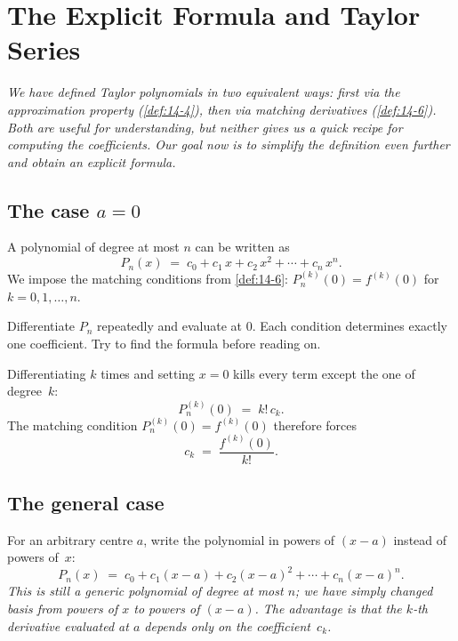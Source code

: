 \section{The Explicit Formula and Taylor Series}
\label{sec:14.5}

\textit{We have defined Taylor polynomials in two equivalent ways: first via the approximation property (\cref{def:14-4}), then via matching derivatives (\cref{def:14-6}).  Both are useful for understanding, but neither gives us a quick recipe for computing the coefficients.  Our goal now is to simplify the definition even further and obtain an explicit formula.}

\subsection*{The case $a=0$}

A polynomial of degree at most $n$ can be written as
\[
  P_{n}(x) \;=\; c_{0}+c_{1}\,x+c_{2}\,x^{2}+\cdots+c_{n}\,x^{n}.
\]
We impose the matching conditions from \cref{def:14-6}: $P_{n}^{(k)}(0)=f^{(k)}(0)$ for $k=0,1,\ldots,n$.

\begin{remark}
Differentiate $P_{n}$ repeatedly and evaluate at $0$.  Each condition determines exactly one coefficient.  Try to find the formula before reading on.
\end{remark}

Differentiating $k$ times and setting $x=0$ kills every term except the one of degree~$k$:
\[
  P_{n}^{(k)}(0) \;=\; k!\,c_{k}.
\]
The matching condition $P_{n}^{(k)}(0)=f^{(k)}(0)$ therefore forces
\[
  c_{k} \;=\; \frac{f^{(k)}(0)}{k!}.
\]

\subsection*{The general case}

For an arbitrary centre $a$, write the polynomial in powers of $(x-a)$ instead of powers of~$x$:
\[
  P_{n}(x) \;=\; c_{0}+c_{1}(x-a)+c_{2}(x-a)^{2}+\cdots+c_{n}(x-a)^{n}.
\]
\textit{This is still a generic polynomial of degree at most $n$; we have simply changed basis from powers of $x$ to powers of $(x-a)$.  The advantage is that the $k$-th derivative evaluated at $a$ depends only on the coefficient~$c_{k}$.}


